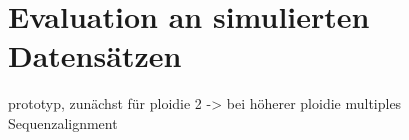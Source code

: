 \chapter{Evaluation an simulierten Datensätzen} \label{sec:}
prototyp, zunächst für ploidie 2 -> bei höherer ploidie multiples Sequenzalignment ~\cite{liu_2010}

\section{} \label{sec:}
\subsection{} \label{subsec:}
